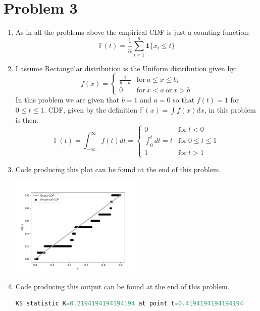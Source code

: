 \documentclass{article}
\newcommand{\field}[1]{\mathbb{#1}}
\newcommand{\1}{\mathbf{1}}
\newcommand{\F}{\field{F}} %
\begin{document}
\section*{Problem 3}
\begin{enumerate}
	\item As in all the problems above the empirical CDF is just a counting function:
	$$\F(t) = \frac{1}{n}\sum_{i=1}^n \1\{x_i\leq t\}$$
	
	\item I assume Rectangular distribution is the Uniform distribution given by:
	$$ f(x)=\begin{cases}
            \frac{1}{b - a} & \mathrm{for}\ a \le x \le b, \\
            0 & \mathrm{for}\ x<a\ \mathrm{or}\ x>b
            \end{cases}
    $$
    In this problem we are given that $b=1$ and $a=0$ so that $f(t)=1$ for $0\leq t \leq 1$. CDF, given by the definition $\F(x) = \int f(x) dx$, in this problem is then:
    $$ \F(t) = \int_{-\infty}^{\infty} f(t) dt = 
        \begin{cases}
            0 & \mathrm{for}\ t < 0 \\
            \int_0^tdt = t & \mathrm{for}\ 0 \leq t \leq 1 \\
            1 & \mathrm{for}\  t > 1
        \end{cases}
    $$
    
    \item Code producing this plot can be found at the end of this problem.
    \begin{center}
    \includegraphics[width=2.5in]{STATS509/HW2/HW2Figures/problem3.png}
    \end{center}
    
    \item Code producing this output can be found at the end of this problem.
    \begin{lstlisting}[language=Python]
        KS statistic K=0.2194194194194194 at point t=0.4194194194194194
    \end{lstlisting}

\newpage

\end{enumerate}	
	
\end{document}
